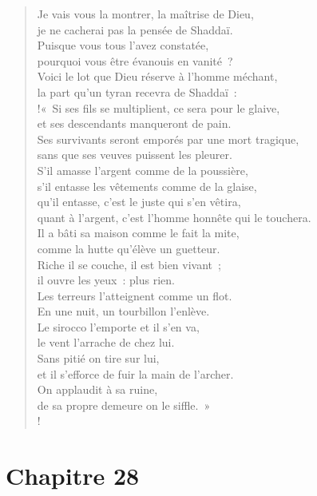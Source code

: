 \documentclass[french,twoside]{book} %
\newcommand\chapteropen{} %
\newcommand\chapterclose{} %
\begin{document}
\begin{verse}
Je vais vous la montrer, la maîtrise de Dieu, \\
je ne cacherai pas la pensée de Shaddaï.\\
Puisque vous tous l’avez constatée, \\
pourquoi vous être évanouis en vanité ?\\
Voici le lot que Dieu réserve à l’homme méchant, \\
la part qu’un tyran recevra de Shaddaï :\\!« Si ses fils se multiplient, ce sera pour le glaive, \\
et ses descendants manqueront de pain.\\
Ses survivants seront emporés par une mort tragique, \\
sans que ses veuves puissent les pleurer.\\
S’il amasse l’argent comme de la poussière, \\
s’il entasse les vêtements comme de la glaise,\\
qu’il entasse, c’est le juste qui s’en vêtira, \\
quant à l’argent, c’est l’homme honnête qui le touchera.\\
Il a bâti sa maison comme le fait la mite, \\
comme la hutte qu’élève un guetteur.\\
Riche il se couche, il est bien vivant ; \\
il ouvre les yeux : plus rien.\\
Les terreurs l’atteignent comme un flot. \\
En une nuit, un tourbillon l’enlève.\\
Le sirocco l’emporte et il s’en va, \\
le vent l’arrache de chez lui.\\
Sans pitié on tire sur lui, \\
et il s’efforce de fuir la main de l’archer.\\
On applaudit à sa ruine, \\
de sa propre demeure on le siffle. »\\!
\end{verse}
\chapterclose


\chapteropen
\chapter[Chapitre 28]{Chapitre 28}\renewcommand{\leftmark}{Chapitre 28}
\end{document}
